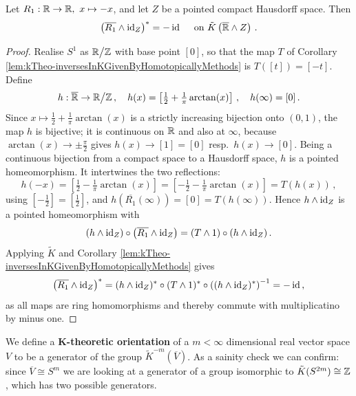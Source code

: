 \begin{lemma}\label{lem:reflection-is-minus-one}
	Let $R_1:\mathbb{R}\to\mathbb{R},\ x\mapsto -x$, and let $Z$ be a pointed compact Hausdorff
	space. Then
	\begin{equation*}
		\left(\overline{R_1}\wedge \operatorname{\mathrm{id}}_Z\right)^*=-\operatorname{\mathrm{id}} \quad\text{ on } \tilde{K}\left(\overline{\mathbb{R}}\wedge Z\right)\,.
	\end{equation*}
\end{lemma}
\begin{proof}
	Realise $S^1$ as $\mathbb{R}\big/\mathbb{Z}$ with base point $[0]$, so that the map $T$ of
	Corollary \ref{lem:kTheo-inversesInKGivenByHomotopicallyMethods} is
	$T([t])=[-t]$. Define
	\begin{equation*}
		h:\overline{\mathbb{R}}\to \mathbb{R}\big/\mathbb{Z}\,,\quad h(x)=\left[\tfrac{1}{2}+\tfrac{1}{\pi}\arctan(x)\right]\,,\quad h(\infty)=[0]\,.
	\end{equation*}
	Since $x\mapsto \tfrac12+\tfrac1\pi\arctan(x)$ is a strictly increasing bijection
	onto $(0,1)$, the map $h$ is bijective; it is continuous on $\mathbb{R}$ and also at
	$\infty$, because $\arctan(x)\to\pm\tfrac{\pi}{2}$ gives $h(x)\to[1]=[0]$ resp.\
	$h(x)\to[0]$. Being a continuous bijection from a compact space to a Hausdorff
	space, $h$ is a pointed homeomorphism. It intertwines the two reflections:
	\begin{equation*}
		h(-x)=\left[\tfrac12-\tfrac{1}{\pi}\arctan(x)\right]=\left[-\tfrac12-\tfrac{1}{\pi}\arctan(x)\right]=T(h(x))\,,
	\end{equation*}
	using $[-\tfrac12]=[\tfrac12]$, and $h(\overline{R_1}(\infty))=[0]=T(h(\infty))$.
	Hence $h\wedge \operatorname{\mathrm{id}}_Z$ is a pointed homeomorphism with
	\begin{equation*}
		(h\wedge\operatorname{\mathrm{id}}_Z)\circ\left(\overline{R_1}\wedge\operatorname{\mathrm{id}}_Z\right)=(T\wedge 1)\circ (h\wedge \operatorname{\mathrm{id}}_Z)\,.
	\end{equation*}
	Applying $\tilde{K}$ and Corollary
	\ref{lem:kTheo-inversesInKGivenByHomotopicallyMethods} gives
	\begin{equation*}
		\left(\overline{R_1}\wedge\operatorname{\mathrm{id}}_Z\right)^*=(h\wedge\operatorname{\mathrm{id}}_Z)^*\circ (T\wedge1)^*\circ\left((h\wedge\operatorname{\mathrm{id}}_Z)^*\right)^{-1}=-\operatorname{\mathrm{id}}\,,
	\end{equation*}
	as all maps are ring homomorphisms and thereby commute with multiplicatino by minus one.
\end{proof}




\begin{definition}
     We define a \textbf{K-theoretic orientation} of a $m<\infty$ dimensional real vector space $V$ to be a generator of the group $\tilde{K}^{-m}(\overline{V})$. As a sainity check we can confirm: since $\overline{V}\cong S^m$ we are looking at a generator of a group isomorphic to $\tilde{K}(S^{2m})\cong \mathbb{Z}$, which has two possible generators.
\end{definition}




